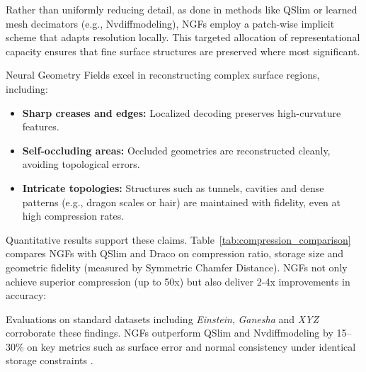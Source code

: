 Rather than uniformly reducing detail, as done in methods like QSlim or learned mesh decimators (e.g., Nvdiffmodeling), NGFs employ a patch-wise implicit scheme that adapts resolution locally. 
This targeted allocation of representational capacity ensures that fine surface structures are preserved where most significant. 

Neural Geometry Fields excel in reconstructing complex surface regions, including:
\begin{itemize}
    \item \textbf{Sharp creases and edges:} Localized decoding preserves high-curvature features.
    \item \textbf{Self-occluding areas:} Occluded geometries are reconstructed cleanly, avoiding topological errors.
    \item \textbf{Intricate topologies:} Structures such as tunnels, cavities and dense patterns (e.g., dragon scales or hair) are maintained with fidelity, even at high compression rates.
\end{itemize}

Quantitative results support these claims. 
Table~\ref{tab:compression_comparison} compares NGFs with QSlim and Draco on compression ratio, storage size and geometric fidelity (measured by Symmetric Chamfer Distance). 
NGFs not only achieve superior compression (up to 50x) but also deliver 2-4x improvements in accuracy: 

\begin{table}[h]
\caption{Compression vs. reconstruction fidelity. Chamfer Distances are scaled by $10^5$ and normalized by the bounding box diagonal.}
\centering
{}
\label{tab:compression_comparison}
\end{table}

Evaluations on standard datasets including \textit{Einstein}, \textit{Ganesha} and \textit{XYZ} corroborate these findings. 
NGFs outperform QSlim and Nvdiffmodeling by 15--30\% on key metrics such as surface error and normal consistency under identical storage constraints \cite{sivaram2024}.

